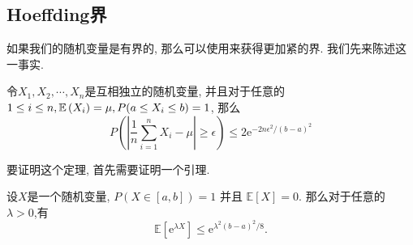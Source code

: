 \subsection{Hoeffding界}

如果我们的随机变量是有界的, 那么可以使用来获得更加紧的界. 我们先来陈述这一事实. 

\begin{theorem}[Hoeffding界]
    令$X_1, X_2, \cdots, X_n$是互相独立的随机变量, 并且对于任意的$1\leq i\leq n, \mathbb E\left(X_i\right)=\mu, P(a\leq X_i \leq b)=1$, 那么
    $$
P\left(\left|\frac{1}{n} \sum_{i=1}^n X_i-\mu\right| \geq \epsilon\right) \leq 2 \mathrm{e}^{-2 n \epsilon^2 /(b-a)^2}
$$
\end{theorem}

要证明这个定理, 首先需要证明一个引理. 
\begin{lemma}
    设$X$是一个随机变量, $P(X \in[a, b])=1$ 并且 $\mathbb{E}[X]=0$. 那么对于任意的 $\lambda>0$,有
    $$
\mathbb{E}\left[\mathrm{e}^{\lambda X}\right] \leq \mathrm{e}^{\lambda^2(b-a)^2 / 8} .
$$
\end{lemma}

